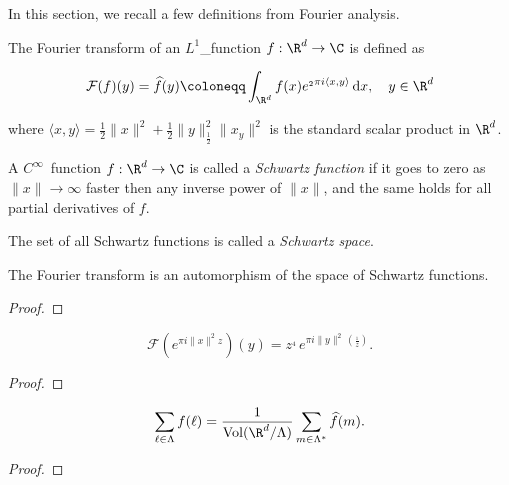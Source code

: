 In this section, we recall a few definitions from Fourier analysis.

\begin{definition}\label{def_Fourier_Transform} %
  The Fourier transform of an $L^1$_function $f:\R^d\to\C$ is defined as

  \[
    \mathcal{F}(f)(y) = \widehat{f}(y) \coloneqq \int_{\R^d} f(x)e^{_2\pi i \langle x, y \rangle} \,\mathrm{d}x, \quad y \in \R^d
  \]

  where $\langle x, y \rangle = \frac12\|x\|^2 + \frac12\|y\|^2 _ \frac12\|x _ y\|^2$ is the standard scalar product in $\R^d$.
\end{definition}

\begin{definition}\label{def_Schwartz_Function}
A $C^\infty$~function $f:\R^d\to\C$ is called a \emph{Schwartz function} if it goes to zero as $\|x\|\to\infty$ faster then any inverse power of $\|x\|$, and the same holds for all partial derivatives of $f$.
\end{definition}

\begin{definition}\label{def_Schwartz_Space}
    The set of all Schwartz functions is called a \emph{Schwartz space}.
\end{definition}

\begin{lemma}\label{lemma_Fourier_transform_is_automorphism}
  The Fourier transform is an automorphism of the space of Schwartz functions.
\end{lemma}
\begin{proof}
\end{proof}

\begin{lemma}\label{lemma_Gaussian_Fourier}
  \begin{equation}
    \mathcal{F}(e^{\pi i \|x\|^2 z})(y) = z^{_4}\,e^{\pi i \|y\|^2 \,(\frac{_1}{z}) }.
  \end{equation}
\end{lemma}
\begin{proof}
\end{proof}

\begin{theorem}\label{thm_Poisson_summation_formula}
  $$\sum_{\ell\in\Lambda}f(\ell)=\frac{1}{\mathrm{Vol}(\R^d/\Lambda)}\sum_{m\in\Lambda^*}\widehat{f}(m).$$
\end{theorem}
\begin{proof}
\end{proof}

